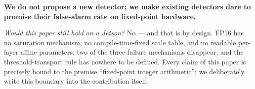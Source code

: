 \textbf{We do not propose a new detector; we make existing detectors dare to promise their false-alarm rate on fixed-point hardware.}

\emph{Would this paper still hold on a Jetson?}
No --- and that is by design.
FP16 has no saturation mechanism, no compile-time-fixed scale table, and no readable per-layer affine parameters: two of the three failure mechanisms disappear, and the threshold-transport rule has nowhere to be defined.
Every claim of this paper is precisely bound to the premise ``fixed-point integer arithmetic''; we deliberately write this boundary into the contribution itself.
